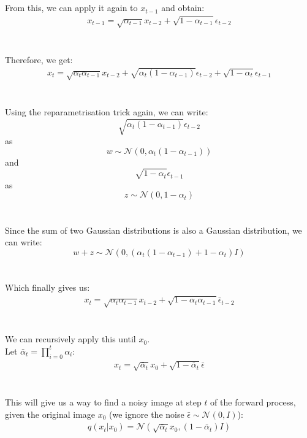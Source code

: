 \documentclass{article}
\begin{document}
\\\\
From this, we can apply it again to $x_{t-1}$ and obtain:
\begin{gather*}
  x_{t-1} = \sqrt{\alpha_{t-1}} x_{t-2} + \sqrt{1 - \alpha_{t-1}} \epsilon_{t - 2}
\end{gather*}
\\\\
Therefore, we get:
\begin{gather*}
  x_t = \sqrt{\alpha_t \alpha_{t-1}} x_{t-2} + \sqrt{\alpha_t\left(1 - \alpha_{t-1}\right)} \epsilon_{t - 2} + \sqrt{1 - \alpha_t} \epsilon_{t - 1}
\end{gather*}
\\\\
Using the reparametrisation trick again, we can write:
$$\sqrt{\alpha_t\left(1 - \alpha_{t-1}\right)} \epsilon_{t - 2}$$ 
as 
$$w \sim \mathcal{N}\left(0, \alpha_t\left(1 - \alpha_{t-1}\right)\right)$$
and
$$\sqrt{1 - \alpha_t} \epsilon_{t - 1}$$
as
$$z \sim \mathcal{N}\left(0, 1 - \alpha_t\right)$$
\\\\
Since the sum of two Gaussian distributions is also a Gaussian distribution, we can write:
$$w + z \sim \mathcal{N}\left(0, \left(\alpha_t\left(1 - \alpha_{t-1}\right) + 1 - \alpha_t\right)I\right)$$
\\\\
Which finally gives us:
\begin{gather*}
  x_t = \sqrt{\alpha_t \alpha_{t-1}} x_{t-2} + \sqrt{1 - \alpha_t \alpha_{t-1}} \bar{\epsilon}_{t - 2}
\end{gather*}
\\\\
We can recursively apply this until $x_0$. \\
Let $\bar{\alpha}_t = \prod_{i=0}^{t}{\alpha_i}$:
\begin{gather}
  x_t = \sqrt{\bar{\alpha}_t} x_0 + \sqrt{1 - \bar{\alpha}_t} \bar{\epsilon} \label{eq:3}
\end{gather}
\\\\
This will give us a way to find a noisy image at step $t$ of the forward process, given the original image $x_0$ (we ignore the noise $\bar{\epsilon} \sim \mathcal{N}\left(0, I\right)$):
\begin{gather}
  q\left(x_t | x_0\right) = \mathcal{N}\left(\sqrt{\bar{\alpha}_t} x_0, \left(1 - \bar{\alpha}_t\right)I\right) \label{eq:4}
\end{gather}
\end{document}
